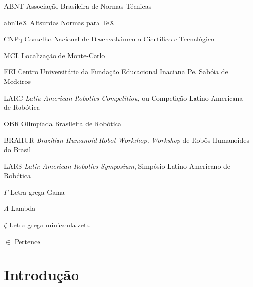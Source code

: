 \documentclass[
  12pt,       %
  oneside,
  a4paper,      %
  english,      %
  french,       %
  spanish,      %
  brazil,       %
  ]{abntex2}
\begin{document}
\listoffigures*
\cleardoublepage

\listoftables*
\cleardoublepage

\begin{siglas}
  \item[ABNT] Associação Brasileira de Normas Técnicas
  \item[abnTeX] ABsurdas Normas para TeX
  \item[CNPq] Conselho Nacional de Desenvolvimento Científico e Tecnológico
  \item[MCL] Localização de Monte-Carlo
  \item[FEI] Centro Universitário da Fundação Educacional Inaciana Pe. Sabóia de Medeiros
  \item[LARC] \textit{Latin American Robotics Competition}, ou Competição Latino-Americana de Robótica
  \item[OBR] Olimpíada Brasileira de Robótica
  \item[BRAHUR] \textit{Brazilian Humanoid Robot Workshop}, \textit{Workshop} de Robôs Humanoides do Brasil
  \item[LARS] \textit{Latin American Robotics Symposium}, Simpósio Latino-Americano de Robótica
\end{siglas}

\begin{simbolos}
  \item[$ \Gamma $] Letra grega Gama
  \item[$ \Lambda $] Lambda
  \item[$ \zeta $] Letra grega minúscula zeta
  \item[$ \in $] Pertence
\end{simbolos}

\tableofcontents*
\cleardoublepage


\textual

\chapter{Introdução}
\end{document}
